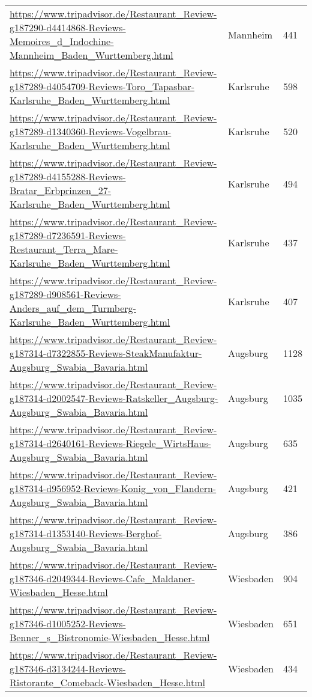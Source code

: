 \begin{table}[]
{\begin{tabular}{lll}
\url{https://www.tripadvisor.de/Restaurant\_Review-g187290-d4414868-Reviews-Memoires\_d\_Indochine-Mannheim\_Baden\_Wurttemberg.html} & Mannheim & 441 \\ 
\url{https://www.tripadvisor.de/Restaurant\_Review-g187289-d4054709-Reviews-Toro\_Tapasbar-Karlsruhe\_Baden\_Wurttemberg.html} & Karlsruhe & 598 \\ 
\url{https://www.tripadvisor.de/Restaurant\_Review-g187289-d1340360-Reviews-Vogelbrau-Karlsruhe\_Baden\_Wurttemberg.html} & Karlsruhe & 520 \\ 
\url{https://www.tripadvisor.de/Restaurant\_Review-g187289-d4155288-Reviews-Bratar\_Erbprinzen\_27-Karlsruhe\_Baden\_Wurttemberg.html} & Karlsruhe & 494 \\ 
\url{https://www.tripadvisor.de/Restaurant\_Review-g187289-d7236591-Reviews-Restaurant\_Terra\_Mare-Karlsruhe\_Baden\_Wurttemberg.html} & Karlsruhe & 437 \\ 
\url{https://www.tripadvisor.de/Restaurant\_Review-g187289-d908561-Reviews-Anders\_auf\_dem\_Turmberg-Karlsruhe\_Baden\_Wurttemberg.html} & Karlsruhe & 407 \\ 
\url{https://www.tripadvisor.de/Restaurant\_Review-g187314-d7322855-Reviews-SteakManufaktur-Augsburg\_Swabia\_Bavaria.html} & Augsburg & 1128 \\ 
\url{https://www.tripadvisor.de/Restaurant\_Review-g187314-d2002547-Reviews-Ratskeller\_Augsburg-Augsburg\_Swabia\_Bavaria.html} & Augsburg & 1035 \\ 
\url{https://www.tripadvisor.de/Restaurant\_Review-g187314-d2640161-Reviews-Riegele\_WirtsHaus-Augsburg\_Swabia\_Bavaria.html} & Augsburg & 635 \\ 
\url{https://www.tripadvisor.de/Restaurant\_Review-g187314-d956952-Reviews-Konig\_von\_Flandern-Augsburg\_Swabia\_Bavaria.html} & Augsburg & 421 \\ 
\url{https://www.tripadvisor.de/Restaurant\_Review-g187314-d1353140-Reviews-Berghof-Augsburg\_Swabia\_Bavaria.html} & Augsburg & 386 \\ 
\url{https://www.tripadvisor.de/Restaurant\_Review-g187346-d2049344-Reviews-Cafe\_Maldaner-Wiesbaden\_Hesse.html} & Wiesbaden & 904 \\ 
\url{https://www.tripadvisor.de/Restaurant\_Review-g187346-d1005252-Reviews-Benner\_s\_Bistronomie-Wiesbaden\_Hesse.html} & Wiesbaden & 651 \\ 
\url{https://www.tripadvisor.de/Restaurant\_Review-g187346-d3134244-Reviews-Ristorante\_Comeback-Wiesbaden\_Hesse.html} & Wiesbaden & 434 \\ 

\end{tabular}}
\end{table}

